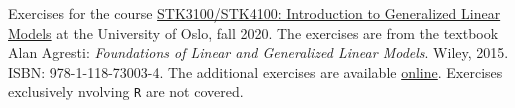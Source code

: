 Exercises for the course \href{https://www.uio.no/studier/emner/matnat/math/STK3100/}{STK3100/STK4100: Introduction to Generalized Linear Models} at the University of Oslo, fall 2020. The exercises are from the textbook Alan Agresti: \textit{Foundations of Linear and Generalized Linear Models}. Wiley, 2015. ISBN: 978-1-118-73003-4. The additional exercises are available \href{https://www.uio.no/studier/emner/matnat/math/STK3100/h20/oppgaver.html}{online}. Exercises exclusively nvolving \texttt{R} are not covered.
